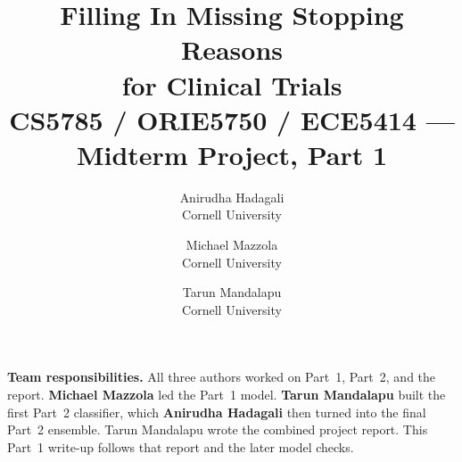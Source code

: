\documentclass[10pt,twocolumn,letterpaper]{article}
\title{Filling In Missing Stopping Reasons\\
for Clinical Trials\\
\vspace{0.35em}
\large CS5785 / ORIE5750 / ECE5414 --- Midterm Project, Part 1}
\author{Anirudha Hadagali\\
Cornell University
\and
Michael Mazzola\\
Cornell University
\and
Tarun Mandalapu\\
Cornell University
}
\begin{document}
\maketitle



\noindent\textbf{Team responsibilities.}
All three authors worked on Part~1, Part~2, and the report.
\textbf{Michael Mazzola} led the Part~1 model.
\textbf{Tarun Mandalapu} built the first Part~2 classifier, which
\textbf{Anirudha Hadagali} then turned into the final Part~2 ensemble.
Tarun Mandalapu wrote the combined project report. This Part~1 write-up
follows that report and the later model checks.





{
    \small
    
    
}
\end{document}
